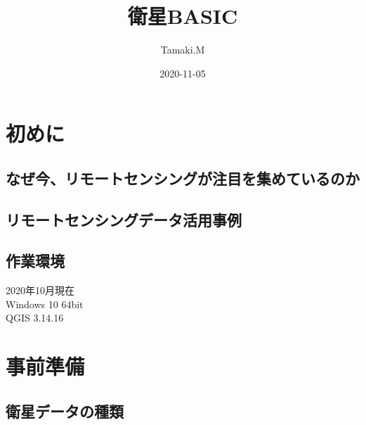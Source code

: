 \documentclass[
]{book}
\title{衛星BASIC}
\author{Tamaki.M}
\date{2020-11-05}
\begin{document}
\maketitle

{
\setcounter{tocdepth}{1}
\tableofcontents
}
\hypertarget{ux521dux3081ux306b}{%
\chapter*{初めに}\label{ux521dux3081ux306b}}

\hypertarget{ux306aux305cux4ecaux30eaux30e2ux30fcux30c8ux30bbux30f3ux30b7ux30f3ux30b0ux304cux6ce8ux76eeux3092ux96c6ux3081ux3066ux3044ux308bux306eux304b}{%
\section{なぜ今、リモートセンシングが注目を集めているのか}\label{ux306aux305cux4ecaux30eaux30e2ux30fcux30c8ux30bbux30f3ux30b7ux30f3ux30b0ux304cux6ce8ux76eeux3092ux96c6ux3081ux3066ux3044ux308bux306eux304b}}

\hypertarget{ux30eaux30e2ux30fcux30c8ux30bbux30f3ux30b7ux30f3ux30b0ux30c7ux30fcux30bfux6d3bux7528ux4e8bux4f8b}{%
\section{リモートセンシングデータ活用事例}\label{ux30eaux30e2ux30fcux30c8ux30bbux30f3ux30b7ux30f3ux30b0ux30c7ux30fcux30bfux6d3bux7528ux4e8bux4f8b}}

\hypertarget{ux4f5cux696dux74b0ux5883}{%
\section{作業環境}\label{ux4f5cux696dux74b0ux5883}}

2020年10月現在\\
Windows 10 64bit\\
QGIS 3.14.16

\hypertarget{ux4e8bux524dux6e96ux5099}{%
\chapter{事前準備}\label{ux4e8bux524dux6e96ux5099}}

\hypertarget{ux885bux661fux30c7ux30fcux30bfux306eux7a2eux985e}{%
\section{衛星データの種類}\label{ux885bux661fux30c7ux30fcux30bfux306eux7a2eux985e}}
\end{document}
